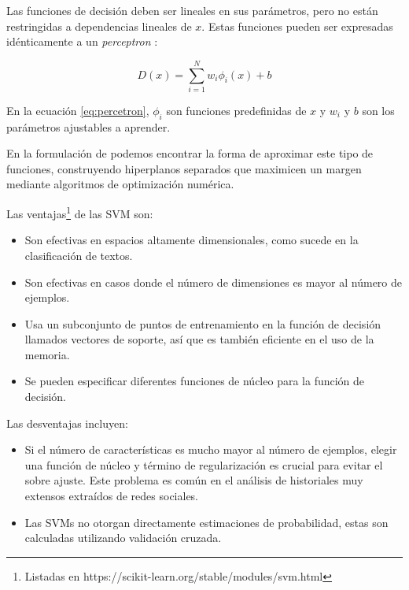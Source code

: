 Las funciones de decisión deben ser lineales en sus parámetros, pero no están restringidas a dependencias lineales de $x$. Estas funciones pueden ser expresadas idénticamente a un \textit{perceptron }\citep{block1962analysis}:

\begin{equation} \label{eq:percetron}
    D(x) = \sum_{i=1}^{N} w_i\phi_i(x) + b
\end{equation}

En la ecuación \ref{eq:percetron}, $ \phi_i$ son funciones predefinidas de $x$ y $w_i$ y $b$ son los parámetros ajustables a aprender.

En la formulación de \citep{boser1992training, cortes1995support} podemos encontrar la forma de  aproximar este tipo de funciones, construyendo hiperplanos separados que maximicen un margen  mediante algoritmos de optimización numérica.

Las ventajas\footnote{Listadas en https://scikit-learn.org/stable/modules/svm.html} de las SVM son: 
\begin{itemize}
    \item Son efectivas en espacios altamente dimensionales, como sucede en la clasificación de textos.
    \item Son efectivas en casos donde el número de dimensiones es mayor al número de ejemplos.
    \item Usa un subconjunto de puntos de entrenamiento en la función de decisión llamados vectores de soporte, así que es también eficiente en el uso de la memoria.
    \item Se pueden especificar diferentes funciones de núcleo para la función de decisión. 
\end{itemize}

Las desventajas incluyen:
\begin{itemize}
    \item Si el número de características es mucho mayor al número de ejemplos, elegir una función de núcleo y término de regularización es crucial para evitar el sobre ajuste. Este problema es común en el análisis de historiales muy extensos extraídos de redes sociales.
    \item Las SVMs no otorgan directamente estimaciones de probabilidad, estas son calculadas utilizando validación cruzada.
    
\end{itemize}
    
    

